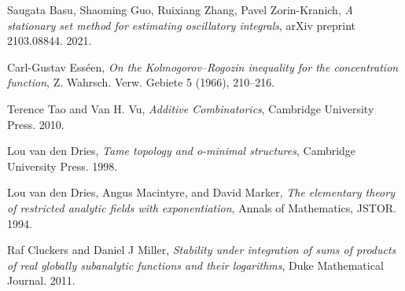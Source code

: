 \documentclass[12pt]{article}
\theoremstyle{definition}
\theoremstyle{remark}
\numberwithin{equation}{section}
\begin{document}
\begin{thebibliography}{20}

    Saugata Basu, Shaoming Guo, Ruixiang Zhang, Pavel Zorin-Kranich,
    \emph{A stationary set method for estimating oscillatory integrals},
    arXiv preprint 2103.08844. 2021.

    Carl-Gustav Ess\'{e}en, \emph{On the {K}olmogorov–{R}ogozin inequality for the concentration function}, Z. Wahrsch. Verw. Gebiete 5 (1966), 210–216.

    Terence Tao and Van H. Vu,
    \emph{Additive Combinatorics},
    Cambridge University Press. 2010.

    Lou van den Dries,
    \emph{Tame topology and o-minimal structures},
    Cambridge University Press. 1998.

    Lou van den Dries, Angus Macintyre, and David Marker, \emph{The elementary theory of restricted analytic fields with exponentiation}, Annals of Mathematics, JSTOR. 1994.

    Raf Cluckers and Daniel J Miller,
    \emph{Stability under integration of sums of products of real globally subanalytic functions and their logarithms},
    Duke Mathematical Journal. 2011.

\end{thebibliography}
\end{document}
